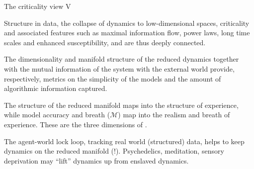 \begin{frame}[label=ladila]{The criticality view V}

   Structure in data, the collapse of dynamics to low-dimensional spaces, criticality and associated features such as maximal information flow, power laws, long time scales and enhanced susceptibility,  \K and \SEP are thus deeply connected. \vfill 
   
The dimensionality and manifold structure of the reduced dynamics together with the mutual information of the system with the external world provide, respectively, metrics on the simplicity of the  models and the amount of algorithmic information captured.  \vfill


The structure of the reduced manifold maps into the structure of experience, while model accuracy and breath ($\mathcal M$) map into the realism and breath of experience.  These are the three dimensions of \SEP. \vfill

The agent-world lock loop, tracking real world (structured) data, helps to keep dynamics on the reduced manifold (\SEP!). Psychedelics, meditation, sensory deprivation may ``lift'' dynamics up from enslaved dynamics.

\end{frame}

